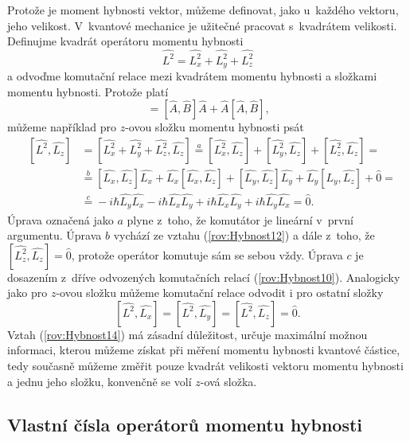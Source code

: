 Protože je moment hybnosti vektor, můžeme definovat, jako u~každého vektoru, jeho velikost. V~kvantové mechanice je užitečné pracovat s~kvadrátem velikosti. Definujme kvadrát operátoru momentu hybnosti
\begin{equation}
\hat{L^2} = \hat{L_x^2}+\hat{L_y^2}+\hat{L_z^2}
\label{rov:Hybnost11}
\end{equation}
a odvoďme komutační relace mezi kvadrátem momentu hybnosti a složkami momentu hybnosti. Protože platí
\begin{equation}
[\hat{A^2},\hat{B}] = [\hat{A},\hat{B}]\hat{A} + \hat{A}[\hat{A},\hat{B}] \mbox{,}
\label{rov:Hybnost12}
\end{equation}
můžeme například pro $z$-ovou složku momentu hybnosti psát
\begin{eqnarray}
&[\hat{L^2}, \hat{L_z}]& = [\hat{L_x^2}+\hat{L_y^2}+\hat{L_z^2}, \hat{L_z}] \stackrel{a}{=} [\hat{L_x^2},\hat{L_z}] + [\hat{L_y^2},\hat{L_z}] + [\hat{L_z^2},\hat{L_z}] = {}
\nonumber\\
&& {}\stackrel{b}{=} [\hat{L_x},\hat{L_z}]\hat{L_x} + \hat{L_x}[\hat{L_x},\hat{L_z}] + [\hat{L_y},\hat{L_z}]\hat{L_y} + \hat{L_y}[\hat{L_y},\hat{L_z}] + \hat{0} = {}
\nonumber\\
&& {} \stackrel{c}{=} -i\hbar \hat{L_y}\hat{L_x} -i\hbar \hat{L_x}\hat{L_y} + i\hbar \hat{L_x}\hat{L_y} + i\hbar \hat{L_y}\hat{L_x} = \hat{0} \mbox{.}
\label{rov:Hybnost13}
\end{eqnarray}
Úprava označená jako $a$ plyne z~toho, že komutátor je lineární v~první argumentu. Úprava $b$ vychází ze vztahu (\ref{rov:Hybnost12}) a dále z~toho, že $ [\hat{L_z^2},\hat{L_z}]=\hat{0}$, protože operátor komutuje sám se sebou vždy. Úprava $c$ je dosazením z~dříve odvozených komutačních relací (\ref{rov:Hybnost10}). Analogicky jako pro $z$-ovou složku můžeme komutační relace odvodit i pro ostatní složky
\begin{equation}
\boxed{[\hat{L^2}, \hat{L_x}] = [\hat{L^2}, \hat{L_y}] = [\hat{L^2}, \hat{L_z}] = \hat{0} \mbox{.}}
\label{rov:Hybnost14}
\end{equation}
Vztah (\ref{rov:Hybnost14}) má zásadní důležitost, určuje maximální možnou informaci, kterou můžeme získat při měření momentu hybnosti kvantové částice, tedy současně můžeme změřit pouze kvadrát velikosti vektoru momentu hybnosti a jednu jeho složku, konvenčně se volí $z$-ová složka.

\subsection{Vlastní čísla operátorů momentu hybnosti}
\label{kap:VlastniCislaMomentHybnosti}

